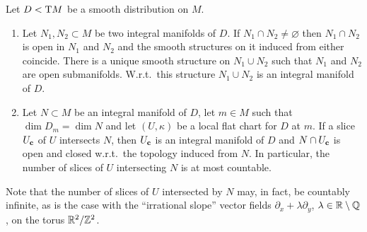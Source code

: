 \begin{lem}[{{\cite[Lem.~3.5.14]{RS1}}}]\label{lem 3.5.14 RS1}
    Let $D<\T M$ be a smooth distribution on $M$.
    \begin{enumerate}
        \item Let $N_1,N_2\subset M$ be two integral manifolds of $D$. If $N_1\cap N_2\neq \varnothing$ then $N_1\cap N_2$ is open in $N_1$ and $N_2$ and the smooth structures on it induced from either coincide. There is a unique smooth structure on $N_1\cup N_2$ such that $N_1$ and $N_2$ are open submanifolds. W.r.t.~this structure $N_1\cup N_2$ is an integral manifold of $D$.

        \item Let $N\subset M$ be an integral manifold of $D$, let $m\in M$ such that $\dim D_m=\dim N$ and let $(U,\kappa)$ be a local flat chart for $D$ at $m$. If a slice $U_{\bf{c}}$ of $U$ intersects $N$, then $U_{\bf{c}}$ is an integral manifold of $D$ and $N\cap U_{\bf{c}}$ is open and closed w.r.t.~the topology induced from $N$. In particular, the number of slices of $U$ intersecting $N$ is at most countable.  
    \end{enumerate}
\end{lem}
Note that the number of slices of $U$ intersected by $N$ may, in fact, be countably infinite, as is the case with the ``irrational slope'' vector fields $\partial_x+\lambda\partial_y$, $\lambda\in\bbR\setminus\bbQ$, on the torus $\bbR^2\slash \bbZ^2$.
